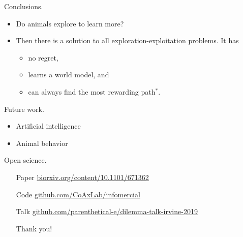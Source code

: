 \documentclass[10pt]{beamer}
\begin{document}
\begin{frame}[fragile]{Conclusions.}
\begin{itemize}
    \item Do animals explore to learn more?
    \item Then there is a solution to all exploration-exploitation problems. It has 
    \begin{itemize}
        \item no regret,
        \item learns a world model, and
        \item can always find the most rewarding path$^*$.
    \end{itemize}
\end{itemize}
\end{frame}

\begin{frame}[fragile]{Future work.}
\begin{itemize}
    \item Artificial intelligence
    \item Animal behavior
\end{itemize}
\end{frame}

\begin{frame}[fragile]{Open science.}
\begin{itemize}
\item[Paper] \url{biorxiv.org/content/10.1101/671362}
\item[Code] \url{github.com/CoAxLab/infomercial}
\item[Talk] \url{github.com/parenthetical-e/dilemma-talk-irvine-2019}
\item[] 
\item[] \alert{Thank you!}
\end{itemize}
\end{frame}
\end{document}
